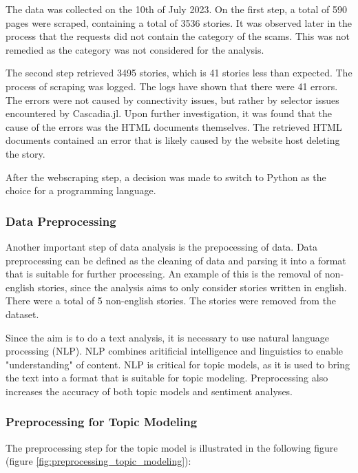 The data was collected on the 10th of July 2023. On the first step, a total of 590 pages were scraped, containing a total of 3536 stories. It was observed later in the process that the requests did not contain the category of the scams. This was not remedied as the category was not considered for the analysis.

The second step retrieved 3495 stories, which is 41 stories less than expected. The process of scraping was logged. The logs have shown that there were 41 errors. The errors were not caused by connectivity issues, but rather by selector issues encountered by Cascadia.jl. Upon further investigation, it was found that the cause of the errors was the HTML documents themselves. The retrieved HTML documents contained an error that is likely caused by the website host deleting the story.

After the webscraping step, a decision was made to switch to Python as the choice for a programming language.

\subsubsection{Data Preprocessing}

Another important step of data analysis is the prepocessing of data. Data preprocessing can be defined as the cleaning of data and parsing it into a format that is suitable for further processing. An example of this is the removal of non-english stories, since the analysis aims to only consider stories written in english. There were a total of 5 non-english stories. The stories were removed from the dataset.

Since the aim is to do a text analysis, it is necessary to use natural language processing (NLP). NLP combines aritificial intelligence and linguistics to enable "understanding" of content. NLP is critical for topic models, as it is used to bring the text into a format that is suitable for topic modeling. Preprocessing also increases the accuracy of both topic models and sentiment analyses.~\cite{haddi2013role}\cite{chauhan2021topic}

\subsubsection*{Preprocessing for Topic Modeling}

The preprocessing step for the topic model is illustrated in the following figure (figure \ref{fig:preprocessing_topic_modeling}):


